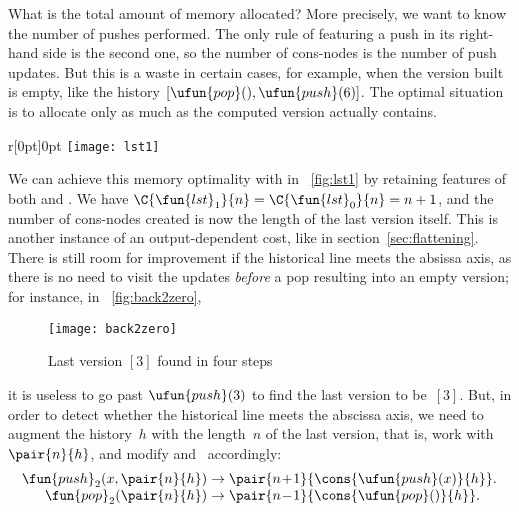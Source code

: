What is the total amount of memory
allocated? More precisely,
we want to know the number of pushes performed. The only rule of
 featuring a push in its right\hyp{}hand side is the
second one, so the number of cons\hyp{}nodes is the number of push
updates. But this is a waste in certain cases, for example, when the
version built is empty, like the history
\([\ufun{pop}(),\ufun{push}(6)]\). The optimal situation is to
allocate only as much as the computed version actually contains.

%
\setlength{\intextsep}{0pt}
\begin{wrapfigure}[]{r}[0pt]{0pt}
\centering
\texttt{[image: lst1]}
\caption{Last version}
\label{fig:lst1}
\end{wrapfigure}
\hspace*{-5.6pt} We can achieve this memory optimality with
 in \fig~\ref{fig:lst1} by retaining features of both
 and .
We have \(\C{\fun{lst}_1}{n} =
\C{\fun{lst}_0}{n} = n + 1\), and the number of
cons\hyp{}nodes created is now the length of the last
version itself. This is another instance of an output\hyp{}dependent
cost, like
 in
section~\vref{sec:flattening}. There is still room for improvement if
the historical line meets the absissa axis, as there is no need to
visit the updates \emph{before} a pop resulting into an empty version;
for instance, in \fig~\vref{fig:back2zero},
\begin{figure}[b]
\centering
\texttt{[image: back2zero]}
\caption{Last version $[3]$ found in four steps}
\label{fig:back2zero}
\end{figure}
it is useless to go past \(\ufun{push}(3)\)
to find the last version to be~\([3]\). But, in order to detect
whether the historical line meets the abscissa axis, we need to
augment the history~\(h\) with the length~\(n\) of the last version,
that is, work with \(\pair{n}{h}\), and modify
and~ accordingly:
\begin{equation*}
\begin{array}{@{}r@{\;}l@{\;}l@{}}
\fun{push}_2(x,\pair{n}{h}) & \rightarrow &
\pair{n\!+\!1}{\cons{\ufun{push}(x)}{h}}.\\
\fun{pop}_2(\pair{n}{h}) & \rightarrow &
\pair{n\!-\!1}{\cons{\ufun{pop}()}{h}}.
\end{array}
\end{equation*}
